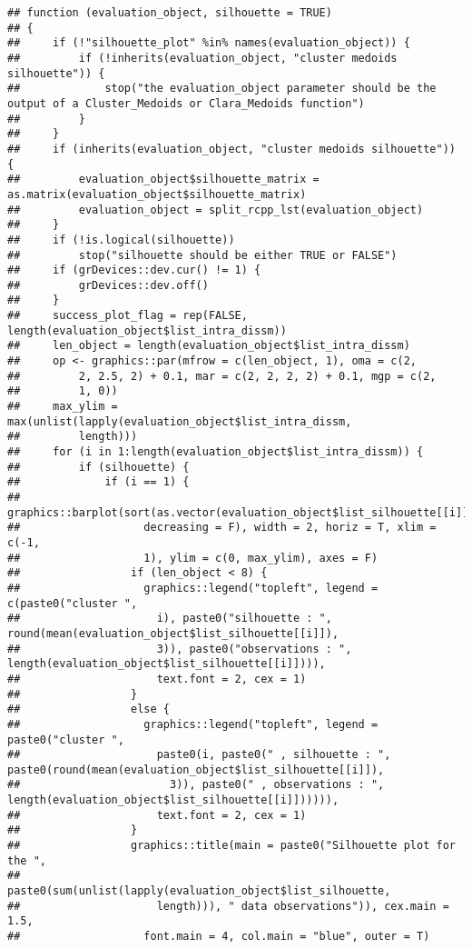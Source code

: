 \documentclass[
]{article}
\begin{document}
\begin{verbatim}
## function (evaluation_object, silhouette = TRUE) 
## {
##     if (!"silhouette_plot" %in% names(evaluation_object)) {
##         if (!inherits(evaluation_object, "cluster medoids silhouette")) {
##             stop("the evaluation_object parameter should be the output of a Cluster_Medoids or Clara_Medoids function")
##         }
##     }
##     if (inherits(evaluation_object, "cluster medoids silhouette")) {
##         evaluation_object$silhouette_matrix = as.matrix(evaluation_object$silhouette_matrix)
##         evaluation_object = split_rcpp_lst(evaluation_object)
##     }
##     if (!is.logical(silhouette)) 
##         stop("silhouette should be either TRUE or FALSE")
##     if (grDevices::dev.cur() != 1) {
##         grDevices::dev.off()
##     }
##     success_plot_flag = rep(FALSE, length(evaluation_object$list_intra_dissm))
##     len_object = length(evaluation_object$list_intra_dissm)
##     op <- graphics::par(mfrow = c(len_object, 1), oma = c(2, 
##         2, 2.5, 2) + 0.1, mar = c(2, 2, 2, 2) + 0.1, mgp = c(2, 
##         1, 0))
##     max_ylim = max(unlist(lapply(evaluation_object$list_intra_dissm, 
##         length)))
##     for (i in 1:length(evaluation_object$list_intra_dissm)) {
##         if (silhouette) {
##             if (i == 1) {
##                 graphics::barplot(sort(as.vector(evaluation_object$list_silhouette[[i]]), 
##                   decreasing = F), width = 2, horiz = T, xlim = c(-1, 
##                   1), ylim = c(0, max_ylim), axes = F)
##                 if (len_object < 8) {
##                   graphics::legend("topleft", legend = c(paste0("cluster ", 
##                     i), paste0("silhouette : ", round(mean(evaluation_object$list_silhouette[[i]]), 
##                     3)), paste0("observations : ", length(evaluation_object$list_silhouette[[i]]))), 
##                     text.font = 2, cex = 1)
##                 }
##                 else {
##                   graphics::legend("topleft", legend = paste0("cluster ", 
##                     paste0(i, paste0(" , silhouette : ", paste0(round(mean(evaluation_object$list_silhouette[[i]]), 
##                       3)), paste0(" , observations : ", length(evaluation_object$list_silhouette[[i]]))))), 
##                     text.font = 2, cex = 1)
##                 }
##                 graphics::title(main = paste0("Silhouette plot for the ", 
##                   paste0(sum(unlist(lapply(evaluation_object$list_silhouette, 
##                     length))), " data observations")), cex.main = 1.5, 
##                   font.main = 4, col.main = "blue", outer = T)

\end{verbatim}
\end{document}
